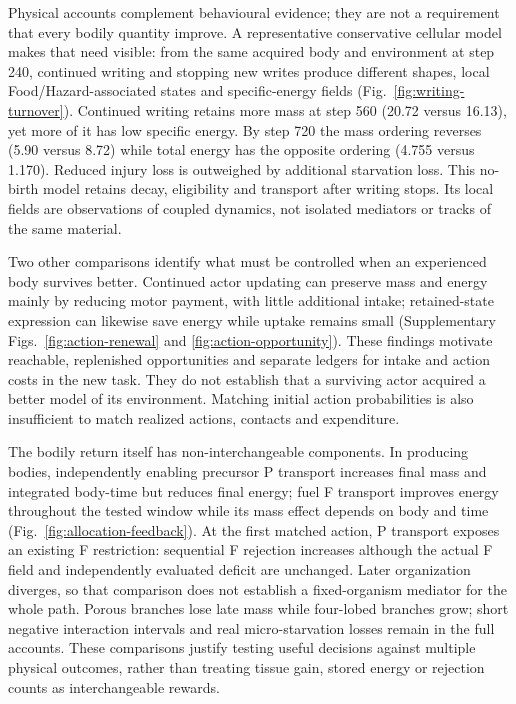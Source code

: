 Physical accounts complement behavioural evidence; they are not a requirement that every bodily quantity improve. A representative conservative cellular model makes that need visible: from the same acquired body and environment at step 240, continued writing and stopping new writes produce different shapes, local Food/Hazard-associated states and specific-energy fields (Fig.~\ref{fig:writing-turnover}). Continued writing retains more mass at step 560 (20.72 versus 16.13), yet more of it has low specific energy. By step 720 the mass ordering reverses (5.90 versus 8.72) while total energy has the opposite ordering (4.755 versus 1.170). Reduced injury loss is outweighed by additional starvation loss. This no-birth model retains decay, eligibility and transport after writing stops. Its local fields are observations of coupled dynamics, not isolated mediators or tracks of the same material.



Two other comparisons identify what must be controlled when an experienced body survives better. Continued actor updating can preserve mass and energy mainly by reducing motor payment, with little additional intake; retained-state expression can likewise save energy while uptake remains small (Supplementary Figs.~\ref{fig:action-renewal} and \ref{fig:action-opportunity}). These findings motivate reachable, replenished opportunities and separate ledgers for intake and action costs in the new task. They do not establish that a surviving actor acquired a better model of its environment. Matching initial action probabilities is also insufficient to match realized actions, contacts and expenditure.




The bodily return itself has non-interchangeable components. In producing bodies, independently enabling precursor P transport increases final mass and integrated body-time but reduces final energy; fuel F transport improves energy throughout the tested window while its mass effect depends on body and time (Fig.~\ref{fig:allocation-feedback}). At the first matched action, P transport exposes an existing F restriction: sequential F rejection increases although the actual F field and independently evaluated deficit are unchanged. Later organization diverges, so that comparison does not establish a fixed-organism mediator for the whole path. Porous branches lose late mass while four-lobed branches grow; short negative interaction intervals and real micro-starvation losses remain in the full accounts. These comparisons justify testing useful decisions against multiple physical outcomes, rather than treating tissue gain, stored energy or rejection counts as interchangeable rewards.



